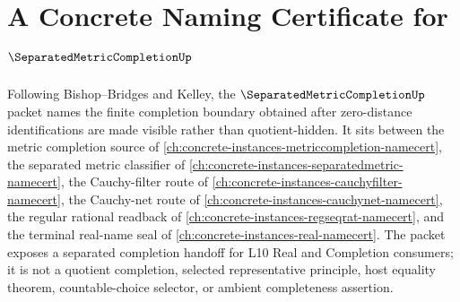 \chapter{A Concrete Naming Certificate for $\SeparatedMetricCompletionUp$}
\label{ch:concrete-instances-separated-metric-completion-namecert}

Following Bishop--Bridges and Kelley, the $\SeparatedMetricCompletionUp$ packet names the finite completion boundary obtained after zero-distance identifications are made visible rather than quotient-hidden. It sits between the metric completion source of \autoref{ch:concrete-instances-metriccompletion-namecert}, the separated metric classifier of \autoref{ch:concrete-instances-separatedmetric-namecert}, the Cauchy-filter route of \autoref{ch:concrete-instances-cauchyfilter-namecert}, the Cauchy-net route of \autoref{ch:concrete-instances-cauchynet-namecert}, the regular rational readback of \autoref{ch:concrete-instances-regseqrat-namecert}, and the terminal real-name seal of \autoref{ch:concrete-instances-real-namecert}. The packet exposes a separated completion handoff for L10 Real and Completion consumers; it is not a quotient completion, selected representative principle, host equality theorem, countable-choice selector, or ambient completeness assertion.

